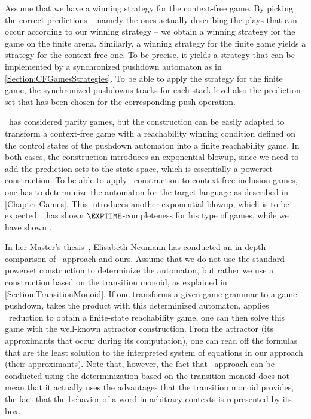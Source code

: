 \documentclass[../../diss.tex]{subfiles}
\begin{document}
Assume that we have a winning strategy for the context-free game.
By picking the correct predictions -- namely the ones actually describing the plays that can occur according to our winning strategy -- we obtain a winning strategy for the game on the finite arena.
Similarly, a winning strategy for the finite game yields a strategy for the context-free one.
To be precise, it yields a strategy that can be implemented by a synchronized pushdown automaton as in \cref{Section:CFGamesStrategies}.
To be able to apply the strategy for the finite game, the synchronized pushdowns tracks for each stack level also the prediction set that has been chosen for the corresponding push operation.

\Walu~has considered parity games, but the construction can be easily adapted to transform a context-free game with a reachability winning condition defined on the control states of the pushdown automaton into a finite reachability game.
In both cases, the construction introduces an exponential blowup, since we need to add the prediction sets to the state space, which is essentially a powerset construction.
To be able to apply \Walus~construction to context-free inclusion games, one has to determinize the automaton for the target language as described in \cref{Chapter:Games}.
This introduces another exponential blowup, which is to be expected: \Walu~has shown $\EXPTIME$-completeness for his type of games, while we have shown .

In her Master's thesis~\cite{Neumann17}, Elisabeth Neumann has conducted an in-depth comparison of \Walus~approach and ours.
Assume that we do not use the standard powerset construction to determinize the automaton, but rather we use a construction based on the transition monoid, as explained in \cref{Section:TransitionMonoid}.
If one transforms a given game grammar to a game pushdown, takes the product with this determinized automaton, applies \Walus~reduction to obtain a finite-state reachability game, one can then solve this game with the well-known attractor construction.
From the attractor (\resp its approximants that occur during its computation), one can read off the formulas that are the least solution to the interpreted system of equations in our approach (\resp their approximants).
Note that, however, the fact that \Walus~approach can be conducted using the determinization based on the transition monoid does not mean that it actually uses the advantages that the transition monoid provides, \eg the fact that the behavior of a word in arbitrary contexts is represented by its box.
\end{document}

